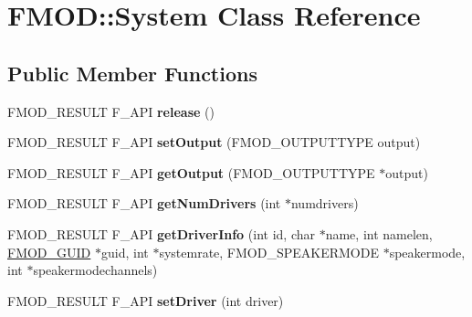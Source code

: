 \hypertarget{classFMOD_1_1System}{}\section{F\+M\+OD\+:\+:System Class Reference}
\label{classFMOD_1_1System}
\subsection*{Public Member Functions}
\begin{DoxyCompactItemize}
\item 
\mbox{\label{classFMOD_1_1System_aa7ac27bd5b475d40b6ca4b3b93a9351d}} 
F\+M\+O\+D\+\_\+\+R\+E\+S\+U\+LT F\+\_\+\+A\+PI {\bfseries release} ()
\item 
\mbox{\label{classFMOD_1_1System_a97cba04b9a36251e4443aaeba23f2d45}} 
F\+M\+O\+D\+\_\+\+R\+E\+S\+U\+LT F\+\_\+\+A\+PI {\bfseries set\+Output} (F\+M\+O\+D\+\_\+\+O\+U\+T\+P\+U\+T\+T\+Y\+PE output)
\item 
\mbox{\label{classFMOD_1_1System_a3abd8e368b7b220b761fd885ba150485}} 
F\+M\+O\+D\+\_\+\+R\+E\+S\+U\+LT F\+\_\+\+A\+PI {\bfseries get\+Output} (F\+M\+O\+D\+\_\+\+O\+U\+T\+P\+U\+T\+T\+Y\+PE $\ast$output)
\item 
\mbox{\label{classFMOD_1_1System_aabd75260613afffc7ef0650ac62ef2f4}} 
F\+M\+O\+D\+\_\+\+R\+E\+S\+U\+LT F\+\_\+\+A\+PI {\bfseries get\+Num\+Drivers} (int $\ast$numdrivers)
\item 
\mbox{\label{classFMOD_1_1System_ac3e42c5e184343d930850b4894112eb9}} 
F\+M\+O\+D\+\_\+\+R\+E\+S\+U\+LT F\+\_\+\+A\+PI {\bfseries get\+Driver\+Info} (int id, char $\ast$name, int namelen, \hyperlink{structFMOD__GUID}{F\+M\+O\+D\+\_\+\+G\+U\+ID} $\ast$guid, int $\ast$systemrate, F\+M\+O\+D\+\_\+\+S\+P\+E\+A\+K\+E\+R\+M\+O\+DE $\ast$speakermode, int $\ast$speakermodechannels)
\item 
\mbox{\label{classFMOD_1_1System_a2ce18295f0e062054e1f8b9421788683}} 
F\+M\+O\+D\+\_\+\+R\+E\+S\+U\+LT F\+\_\+\+A\+PI {\bfseries set\+Driver} (int driver)
\item 
\mbox{\label{classFMOD_1_1System_aeba7030e04c4604da112264e3ddbb8e6}} 

\end{DoxyCompactItemize}
